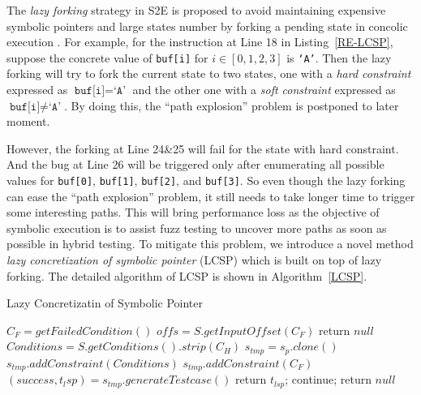 The \textit{lazy forking} strategy in S2E \cite{chipounov2011s2e} is proposed to avoid maintaining expensive symbolic pointers and large states number by forking a pending state in concolic execution \cite{chipounov2011s2e}. 
For example, for the instruction at Line 18 in Listing~\ref{RE-LCSP}, suppose the concrete value of \texttt{buf[i]} for $i\in[0,1,2,3]$ is \texttt{`A'}. 
Then the lazy forking will try to fork the current state to two states, one with a \textit{hard constraint} expressed as $\texttt{buf[i]}=\texttt{`A'}$ and the other one with a \textit{soft constraint} expressed as $\texttt{buf[i]}\neq\texttt{`A'}$.
By doing this, the ``path explosion'' problem is postponed to later moment.
 

However, the forking at Line 24\&25 will fail for the state with hard constraint. And the bug at Line 26 will be triggered only after enumerating all possible values for \texttt{buf[0]}, \texttt{buf[1]}, \texttt{buf[2]}, and \texttt{buf[3]}. So even though the lazy forking can ease the ``path explosion'' problem, it still needs to take longer time to trigger some interesting paths. This will bring performance loss as the objective of symbolic execution is to assist fuzz testing to uncover more paths as soon as possible in hybrid testing. 
To mitigate this problem, we introduce a novel method \emph{lazy concretization of symbolic pointer} (LCSP) which is built on top of lazy forking. The detailed algorithm of LCSP is shown in Algorithm~\ref{LCSP}.

\begin{algorithm}
  \caption{Lazy Concretizatin of Symbolic Pointer}
  \label{LCSP}
  $C_F = getFailedCondition()$\;
  $offs = S.getInputOffset(C_F)$\;
  {
    return $null$\;
  }
  $Conditions = S.getConditions().strip(C_H)$\;
  {
    $s_{tmp} = s_p.clone()$\;
    $s_{tmp}.addConstraint(Conditions)$\;
    $s_{tmp}.addConstraint(C_F)$\;
    $(success, t_lsp) = s_{tmp}.generateTestcase()$\;
    {
      return $t_{lsp}$;
    } {
      continue;
    }
  }
  return $null$\;
\end{algorithm}
  
